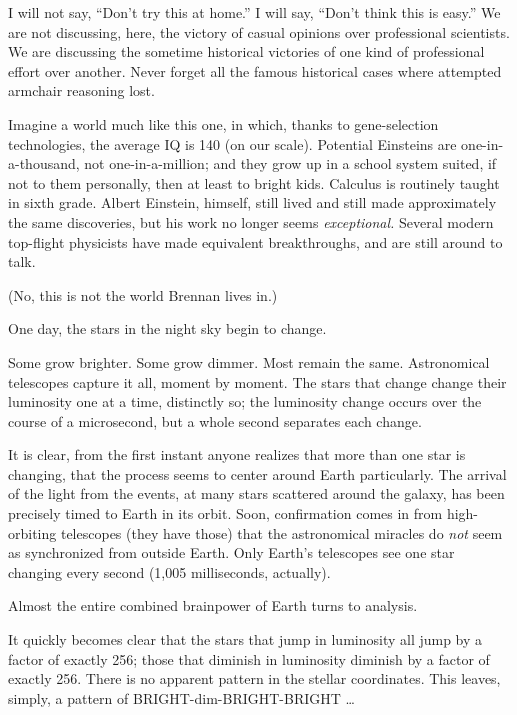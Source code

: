 {
 I will not say, ``Don't try this
at home.'' I will say,
``Don't think this is
easy.'' We are not discussing, here, the victory of
casual opinions over professional scientists. We are discussing the
sometime historical victories of one kind of professional effort over
another. Never forget all the famous historical cases where attempted
armchair reasoning lost.}

\myendsectiontext


\bigskip


{
 Imagine a world much like this one, in which, thanks to
gene-selection technologies, the average IQ is 140 (on our scale).
Potential Einsteins are one-in-a-thousand, not one-in-a-million; and
they grow up in a school system suited, if not to them personally, then
at least to bright kids. Calculus is routinely taught in sixth grade.
Albert Einstein, himself, still lived and still made approximately the
same discoveries, but his work no longer seems \textit{exceptional.}
Several modern top-flight physicists have made equivalent
breakthroughs, and are still around to talk. }

{
 (No, this is not the world Brennan lives in.)}

{
 One day, the stars in the night sky begin to change.}

{
 Some grow brighter. Some grow dimmer. Most remain the same.
Astronomical telescopes capture it all, moment by moment. The stars
that change change their luminosity one at a time, distinctly so; the
luminosity change occurs over the course of a microsecond, but a whole
second separates each change.}

{
 It is clear, from the first instant anyone realizes that more than
one star is changing, that the process seems to center around Earth
particularly. The arrival of the light from the events, at many stars
scattered around the galaxy, has been precisely timed to Earth in its
orbit. Soon, confirmation comes in from high-orbiting telescopes (they
have those) that the astronomical miracles do \textit{not} seem as
synchronized from outside Earth. Only Earth's
telescopes see one star changing every second (1,005 milliseconds,
actually).}

{
 Almost the entire combined brainpower of Earth turns to analysis.}

{
 It quickly becomes clear that the stars that jump in luminosity
all jump by a factor of exactly 256; those that diminish in luminosity
diminish by a factor of exactly 256. There is no apparent pattern in
the stellar coordinates. This leaves, simply, a pattern of
BRIGHT-dim-BRIGHT-BRIGHT \ldots}

